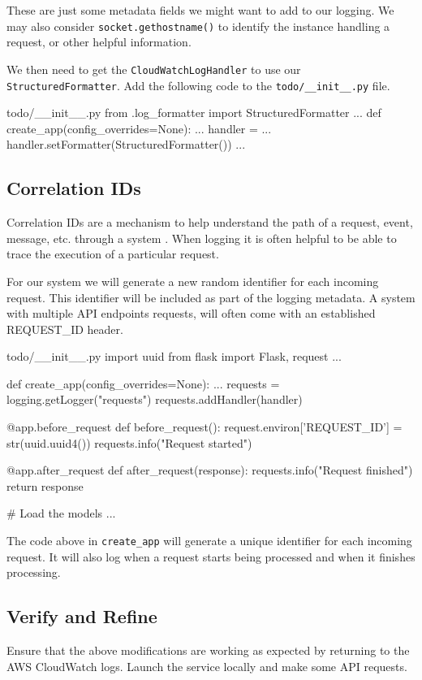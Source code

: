 \documentclass{csse4400}
\begin{document}
These are just some metadata fields we might want to add to our logging.
We may also consider \texttt{socket.gethostname()} to identify the instance handling a request,
or other helpful information.

We then need to get the \texttt{CloudWatchLogHandler} to use our \texttt{StructuredFormatter}.
Add the following code to the \texttt{todo/\_\_init\_\_.py} file.
%
\begin{code}[language=python,numbers=none]{todo/\_\_init\_\_.py}
from .log_formatter import StructuredFormatter
...
def create_app(config_overrides=None): 
    ...
    handler = ...
    handler.setFormatter(StructuredFormatter())
    ...
\end{code}

\subsection{Correlation IDs}

Correlation IDs are a mechanism to help understand the path of a
request, event, message, etc. through a system \cite{logging-slides}.
When logging it is often helpful to be able to trace the execution of a particular request.

For our system we will generate a new random identifier for each incoming request.
This identifier will be included as part of the logging metadata.
A system with multiple API endpoints requests, will often come with an established REQUEST\_ID header.
%
\begin{code}[language=python,numbers=none]{todo/\_\_init\_\_.py}
import uuid
from flask import Flask, request
...

def create_app(config_overrides=None): 
    ...
    requests = logging.getLogger("requests")
    requests.addHandler(handler)

    @app.before_request
    def before_request():
        request.environ['REQUEST_ID'] = str(uuid.uuid4())
        requests.info("Request started")

    @app.after_request
    def after_request(response):
        requests.info("Request finished")
        return response

    # Load the models 
    ...
\end{code}

The code above in \texttt{create\_app} will generate a unique identifier for each incoming request.
It will also log when a request starts being processed and when it finishes processing.

\subsection{Verify and Refine}
Ensure that the above modifications are working as expected by returning to the AWS CloudWatch logs.
Launch the service locally and make some API requests.
\end{document}
